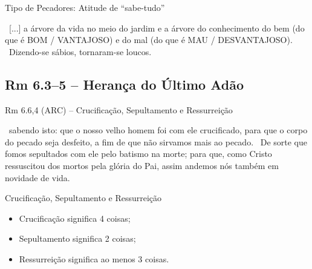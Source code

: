 \documentclass[12pt,aspectratio=169]{beamer}
\newcommand{\ver}[1]{%
    \raisebox{0.50ex}{%
        \scalebox{1.1}{%
            \pmb{\textbf{\textcolor{BSpbg}{#1}}}%
        }%
    }%
}
\newcommand{\QUOTE}[1]{%
    \par\noindent\hspace*{0.05\linewidth}%
    \begin{minipage}{0.9\linewidth}%
        \linespread{1.35}\large{#1}%
    \end{minipage}%
}
\newcommand{\RED}[1]{{\textcolor{TXred}{#1}}}
\newcommand{\YEL}[1]{{\textcolor{TXyel}{#1}}}
\begin{document}
    \begin{frame}{Tipo de Pecadores: \RED{Atitude de ``sabe-tudo''}}
        \QUOTE{%
            \ver{Gn 2.9 (ARA)}~[...] a árvore da vida no meio do jardim e a \RED{árvore do
            conhecimento do bem} (do que é BOM / \YEL{VANTAJOSO}) \RED{e do mal} (do que é MAU /
            \YEL{DESVANTAJOSO}).
            \\[\bigskipamount]
            \ver{Rm 1.22 (ARC)}~\RED{Dizendo-se} sábios, tornaram-se loucos.
        }
    \end{frame}

    \subsection{Rm 6.3--5 -- Herança do Último Adão}

    \begin{frame}{Rm 6.6,4 (ARC) -- \YEL{Crucificação, Sepultamento e Ressurreição}}
        \QUOTE{%
            \ver{6}~sabendo isto: que o nosso velho homem foi com ele \YEL{crucificado}, para
            que o corpo do pecado seja desfeito, a fim de que não sirvamos mais ao pecado.
            \ver{4}~De sorte que fomos \YEL{sepultados} com ele pelo batismo na morte; para que,
            como Cristo \YEL{ressuscitou} dos mortos pela glória do Pai, assim andemos nós
            também em novidade de vida.
        }
    \end{frame}

    \begin{frame}{\YEL{Crucificação, Sepultamento e Ressurreição}}
        \begin{itemize}
            \item \YEL{Crucificação} significa \YEL{4 coisas};
                \\[\bigskipamount]
            \item \YEL{Sepultamento} significa \YEL{2 coisas};
                \\[\bigskipamount]
            \item \YEL{Ressurreição} significa ao menos \YEL{3 coisas}.
        \end{itemize}
    \end{frame}
\end{document}
